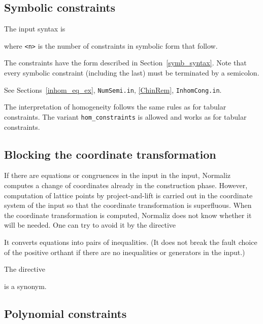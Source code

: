 \subsection{Symbolic constraints}

The input syntax is

\begin{itemize}
	 where \verb|<n>| is the number of constraints in symbolic form that follow.
\end{itemize}

The constraints have the form described in Section~\ref{symb_syntax}. Note that every symbolic constraint (including the last) must be terminated by a semicolon.

See Sections~\ref{inhom_eq_ex}, \verb|NumSemi.in|, \ref{ChinRem}, \verb|InhomCong.in|.

The interpretation of homogeneity follows the same rules as for tabular constraints. The variant \verb|hom_constraints| is allowed and works as for tabular constraints.

\subsection{Blocking the coordinate transformation}

If there are equations or congruences in the input in the input, Normaliz computes a change of coordinates already in the construction phase. However, computation of lattice points by project-and-lift is carried out in the coordinate system of the input so that the coordinate transformation is superfluous.  When the coordinate transformation  is computed, Normaliz does not know whether it will be needed. One can try to avoid it by the directive
\begin{itemize}
\end{itemize}
It converts equations into pairs of inequalities. (It does not break the fault choice of the positive orthant if there are no inequalities or generators in the input.)

The directive
\begin{itemize}
\end{itemize}
is a synonym. 

\subsection{Polynomial constraints}\label{poly_const_input}

